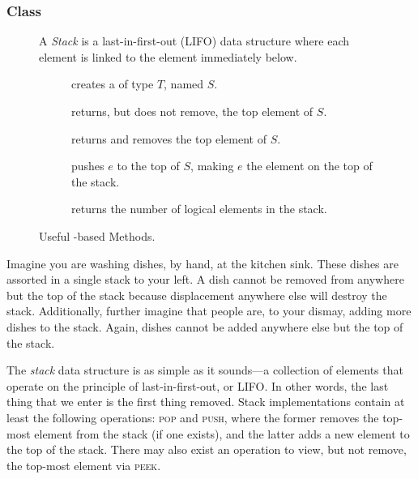 \subsubsection*{ Class}
\begin{figure}[tp]
  \small
  \begin{tcolorbox}[title=Java Stacks]
    A \emph{Stack} is a last-in-first-out (LIFO) data structure where each element is linked to the element immediately below. 
    \vspace{2ex}
  \begin{description}
    \item [] creates a  of type $T$, named $S$.
    \item [] returns, but does not remove, the top element of $S$.
    \item [] returns and removes the top element of $S$.
    \item [] pushes $e$ to the top of $S$, making $e$ the element on the top of the stack.
    \item [] returns the number of logical elements in the stack.
  \end{description}
\end{tcolorbox}
  \caption{Useful -based Methods.}
  \label{fig:stacks}
\end{figure}
Imagine you are washing dishes, by hand, at the kitchen sink. These dishes are assorted in a single stack to your left. A dish cannot be removed from anywhere but the top of the stack because displacement anywhere else will destroy the stack. Additionally, further imagine that people are, to your dismay, adding more dishes to the stack. Again, dishes cannot be added anywhere else but the top of the stack. 

The \emph{stack} data structure is as simple as it sounds---a collection of elements that operate on the principle of last-in-first-out, or LIFO. In other words, the last thing that we enter is the first thing removed. Stack implementations contain at least the following operations: \textsc{pop} and \textsc{push}, where the former removes the top-most element from the stack (if one exists), and the latter adds a new element to the top of the stack. There may also exist an operation to view, but not remove, the top-most element via \textsc{peek}. 

